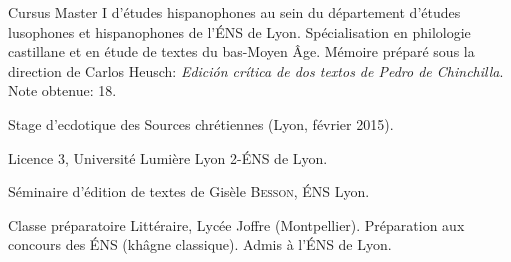 \begin{rubric}{Cursus}
                                \entry*[2014-2015]
                            Master I d'études hispanophones au sein du département d'études lusophones
                        et hispanophones de l'ÉNS de Lyon. Spécialisation en philologie castillane et en
                        étude de textes du bas-Moyen Âge. Mémoire préparé sous la direction de Carlos
                        Heusch: \textit{Edición crítica de dos textos de Pedro de Chinchilla}. Note
                        obtenue: 18.
                    
                                \entry*
                            Stage d’ecdotique des Sources chrétiennes (Lyon, février 2015).
                    
                                \entry*[2013-2014]
                            Licence 3, Université Lumière Lyon 2-ÉNS de Lyon. 
                    
                                \entry*
                            Séminaire d’édition de textes de Gisèle \textsc{Besson}, ÉNS
                        Lyon.
                    
                                \entry*[2011-2013]
                            Classe préparatoire Littéraire, Lycée Joffre (Montpellier). Préparation aux
                        concours des ÉNS (khâgne classique). Admis à l'ÉNS de Lyon.
                    \end{rubric}





